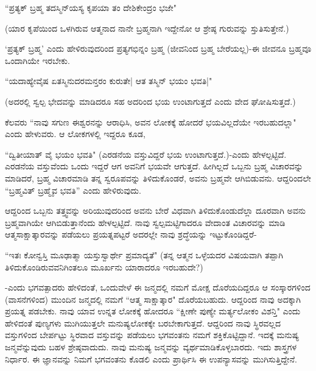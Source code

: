 \begin{shloka}
``ಪ್ರತ್ಯಕ್ ಬ್ರಹ್ಮ ತದಸ್ಮಿನ್‌ಯಸ್ಯ ಕೃಪಯಾ ತಂ ದೇಶಿಕೇಂದ್ರಂ ಭಜೇ"
\end{shloka}

(ಯಾರ ಕೃಪೆಯಿಂದ ಒಳಗಿರುವ ಆತ್ಮನಾದ ನಾನೇ ಬ್ರಹ್ಮನಾಗಿ ಇದ್ದೇನೋ ಆ ಶ್ರೇಷ್ಠ ಗುರುವನ್ನು ಸ್ತುತಿಸುತ್ತೇನೆ.)

`ಪ್ರತ್ಯಕ್ ಬ್ರಹ್ಮ' ಎಂದು ಹೇಳಿರುವುದರಿಂದ ಪ್ರತ್ಯಗಭಿನ್ನಂ ಬ್ರಹ್ಮ (ಜೀವನಿಂದ ಬ್ರಹ್ಮ ಬೇರೆಯಲ್ಲ)-ಈ ಜೀವನೂ ಬ್ರಹ್ಮವೂ ಒಂದಾಗಿಯೇ ಇರಬೇಕು.

\begin{shloka}
``ಯದಾಹ್ಯೇವೈಷ ಏತಸ್ಮಿನುದರಮನ್ತರಂ ಕುರುತೇ| ಆತ ತಸ್ಮಿನ್ ಭಯಂ ಭವತಿ|"
\end{shloka}

(ಅದರಲ್ಲಿ ಸ್ವಲ್ಪ ಭೇದವನ್ನು ಮಾಡಿದರೂ ಸಹ ಅದರಿಂದ ಭಯ ಉಂಟಾಗುತ್ತದೆ ಎಂದು ವೇದ ಘೋಷಿಸುತ್ತದೆ.)

ಕೆಲವರು ``ನಾವು ಸಗುಣ ಈಶ್ವರನನ್ನು ಆರಾಧಿಸಿ, ಅವನ ಲೋಕಕ್ಕೆ ಹೋದರೆ ಭಯವಿಲ್ಲದೆಯೇ ಇರಬಹುದಲ್ಲಾ" ಎಂದು ಹೇಳುವರು. ಆ ಲೋಕಗಳಲ್ಲಿ ಇದ್ದರೂ ಕೂಡ,

``ದ್ವಿತೀಯಾತ್ ವೈ ಭಯಂ ಭವತಿ" (ಎರಡನೆಯ ವಸ್ತುವಿದ್ದರೆ ಭಯ ಉಂಟಾಗುತ್ತದೆ.)-ಎಂದು ಹೇಳಲ್ಪಟ್ಟಿದೆ. ಎರಡನೆಯ ವಸ್ತುವೆಂದು ಒಂದು ಇದ್ದರೆ ಆಗ ಅವನಿಗೆ ಭಯವೇ ಆಗುತ್ತದೆ. ಹೀಗಿಲ್ಲದೆ ಒಬ್ಬನು ಬ್ರಹ್ಮ ವಿಚಾರವನ್ನು ಮಾಡಿದರೆ, ಬ್ರಹ್ಮ ವಿಚಾರಮಾಡಿ ತನ್ನ ಸ್ವರೂಪವನ್ನು ತಿಳಿದುಕೊಂಡರೆ, ಅವನು ಬ್ರಹ್ಮವೇ ಆಗಿಬಿಡುವನು. ಆದ್ದರಿಂದಲೇ ``ಬ್ರಹ್ಮವಿತ್ ಬ್ರಹ್ಮೈವ ಭವತಿ'' ಎಂದು ಹೇಳಿರುವುದು.

ಆದ್ದರಿಂದ ಒಬ್ಬನು ತತ್ತ್ವವನ್ನು ಅರಿಯುವುದರಿಂದ ಅವನು ಬೇರೆ ವಿಧವಾಗಿ ತಿಳಿದುಕೊಂಡುದೆಲ್ಲಾ ದೂರವಾಗಿ ಅವನು ಬ್ರಹ್ಮವಾಗಿಯೇ ಆಗಿಬಿಡುತ್ತಾನೆಂದು ಹೇಳಲ್ಪಟ್ಟಿದೆ. ನಾವು ಸ್ವಲ್ಪಮಟ್ಟಿಗಾದರೂ ವೇದಾಂತ ವಿಚಾರವನ್ನು ಮಾಡಿ ಆತ್ಮಸಾಕ್ಷಾತ್ಕಾರವನ್ನು ಪಡೆಯಲು ಪ್ರಯತ್ನಪಟ್ಟರೆ ಅದರಲ್ಲೇ ನಾವು ಶ್ರದ್ಧೆಯನ್ನು ಇಟ್ಟುಕೊಂಡಿದ್ದರೆ-

``ಇತಃ ಕೋನ್ವಸ್ತಿ ಮೂಢಾತ್ಮಾ ಯಸ್ತುಸ್ವಾರ್ಥೇ ಪ್ರಮಾದ್ಯತೆ" (ತನ್ನ ಆತ್ಮನ ಒಳ್ಳೆಯದರ ವಿಷಯವಾಗಿ ತಪ್ಪಾಗಿ ತಿಳಿದುಕೊಂಡಿರುವವನಿಗಿಂತಲೂ ಮೂರ್ಖನು ಯಾರಾದರೂ ಇರಬಹುದೇ?)

-ಎಂದು ಭಗವತ್ಪಾದರು ಹೇಳಿದಂತೆ, ಒಂದುವೇಳೆ ಈ ಜನ್ಮದಲ್ಲಿ ನಮಗೆ ಮೋಕ್ಷ ದೊರೆಯದಿದ್ದರೂ ಆ ಸಂಸ್ಕಾರಗಳಿಂದ (ವಾಸನೆಗಳಿಂದ) ಮುಂದಿನ ಜನ್ಮದಲ್ಲಿ ನಮಗೆ ``ಆತ್ಮ ಸಾಕ್ಷಾತ್ಕಾರ" ದೊರೆಯಬಹುದು. ಆದ್ದರಿಂದ ನಾವು ಅದಕ್ಕಾಗಿ ಪ್ರಯತ್ನ ಪಡಬೇಕು. ನಾವು ಯಾವ ಉನ್ನತ ಲೋಕಕ್ಕೆ ಹೋದರೂ ``ಕ್ಷೀಣೇ ಪುಣ್ಯೇ ಮರ್ತ್ಯಲೋಕಂ ವಿಶನ್ತಿ" ಎಂದು ಹೇಳಿದಂತೆ ಪುಣ್ಯಗಳು ಮುಗಿಯುತ್ತಲೇ ಮನುಷ್ಯಲೋಕಕ್ಕೇ ಬರಬೇಕಾಗುತ್ತದೆ. ಆದ್ದರಿಂದ ನಾವು ಸ್ಥಿರವಲ್ಲದ ವಸ್ತುಗಳಿಂದ ಬೇರ್ಪಟ್ಟು ಸ್ಥಿರವಾದ ವಸ್ತುವನ್ನು ಪಡೆಯಲು ಭಗವಂತನು ನಮಗೆ ಶಕ್ತಿಕೊಟ್ಟಿದ್ದಾನೆ. ಇದಕ್ಕೆ ಮನುಷ್ಯ ಜನ್ಮವೆನ್ನುವುದು ಬಹಳ ಶ್ರೇಷ್ಠವಾದುದು. ನಾವು ಮನುಷ್ಯ ಜನ್ಮವನ್ನು ವ್ಯರ್ಥಮಾಡಿಕೊಳ್ಳಬಾರದು. ಇದು ಶಾಸ್ತ್ರಗಳ ನಿರ್ಧಾರ. ಈ ಜ್ಞಾನವನ್ನು ನಿಮಗೆ ಭಗವಂತನು ಕೊಡಲಿ ಎಂದು ಪ್ರಾರ್ಥಿಸಿ ಈ ಉಪನ್ಯಾಸವನ್ನು ಮುಗಿಸುತ್ತಿದ್ದೇನೆ.

